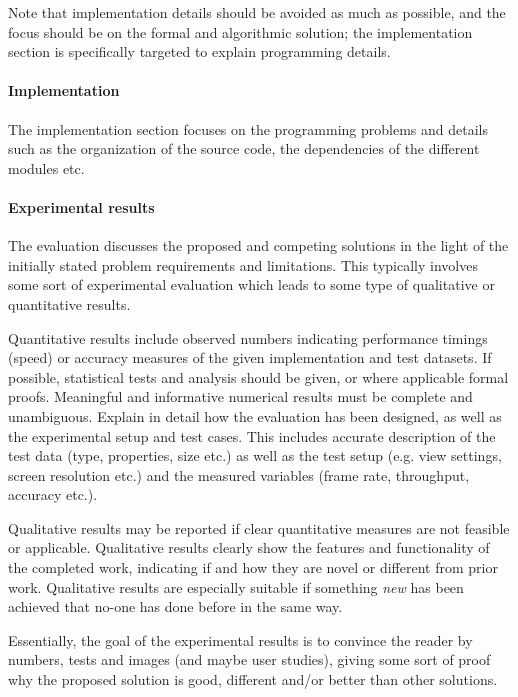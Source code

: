 \documentclass[11pt, a4paper,oneside,chapterprefix=false]{scrbook}
\begin{document}
Note that implementation details should be avoided as much as possible, and the focus should be on the formal and algorithmic solution; the implementation section is specifically targeted to explain programming details.

\paragraph{Implementation}

The implementation section focuses on the programming problems and details such as the organization of the source code, the dependencies of the different modules etc.

\paragraph{Experimental results}

The evaluation discusses the proposed and competing solutions in the light of the initially stated problem requirements and limitations. This typically involves some sort of experimental evaluation which leads to some type of qualitative or quantitative results.

Quantitative results include observed numbers indicating performance timings (speed) or accuracy measures of the given implementation and test datasets. If possible, statistical tests and analysis should be given, or where applicable formal proofs. Meaningful and informative numerical results must be complete and unambiguous. Explain in detail how the evaluation has been designed, as well as the experimental setup and test cases. This includes accurate description of the test data (type, properties, size etc.) as well as the test setup (e.g. view settings, screen resolution etc.) and the measured variables (frame rate, throughput, accuracy etc.).

Qualitative results may be reported if clear quantitative measures are not feasible or applicable. Qualitative results clearly show the features and functionality of the completed work, indicating if and how they are novel or different from prior work. Qualitative results are especially suitable if something {\em new} has been achieved that no-one has done before in the same way.

Essentially, the goal of the experimental results is to convince the reader by numbers, tests and images (and maybe user studies), giving some sort of proof why the proposed solution is good, different and/or better than other solutions.
\end{document}
